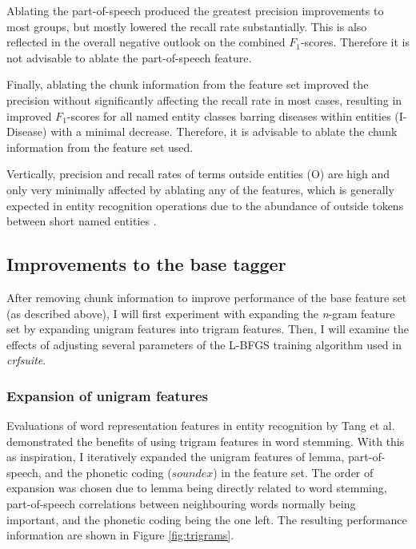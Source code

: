 \documentclass[10pt, oneside]{article}
\begin{document}
Ablating the part-of-speech produced the greatest precision improvements to most groups, but mostly lowered the recall rate substantially. This is also reflected in the overall negative outlook on the combined $F_1$-scores. Therefore it is not advisable to ablate the part-of-speech feature. 

Finally, ablating the chunk information from the feature set improved the precision without significantly affecting the recall rate in most cases, resulting in improved $F_1$-scores for all named entity classes barring diseases within entities (I-Disease) with a minimal decrease. Therefore, it is advisable to ablate the chunk information from the feature set used.

Vertically, precision and recall rates of terms outside entities (O) are high and only very minimally affected by ablating any of the features, which is generally expected in entity recognition operations due to the abundance of outside tokens between short named entities \cite{ratinov2009design}.

\subsection{Improvements to the base tagger}

After removing chunk information to improve performance of the base feature set (as described above), I will first experiment with expanding the \emph{n}-gram feature set by expanding unigram features into trigram features. Then, I will examine the effects of adjusting several parameters of the L-BFGS training algorithm used in \emph{crfsuite}.

\subsubsection{Expansion of unigram features}

Evaluations of word representation features in entity recognition by Tang et al. \cite{tang2014evaluating} demonstrated the benefits of using trigram features in word stemming. With this as inspiration, I iteratively expanded the unigram features of lemma, part-of-speech, and the phonetic coding ($soundex$) in the feature set. The order of expansion was chosen due to lemma being directly related to word stemming, part-of-speech correlations between neighbouring words normally being important, and the phonetic coding being the one left. The resulting performance information are shown in Figure \ref{fig:trigrams}.
\end{document}
